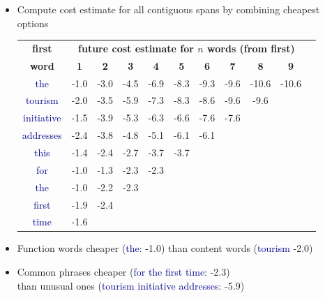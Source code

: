 \documentclass[landscape]{slides}
\newcommand{\example}[1]{\textcolor{darkblue}{\rm #1}}
\begin{document}
\begin{itemize} \vspace{-4mm}
\item Compute cost estimate for all contiguous spans by combining cheapest options\vspace{-2mm}
\begin{center}
\begin{tabular}{|c|c|c|c|c|c|c|c|c|c|c|} \hline
\bf first & \multicolumn{9}{c|}{\bf future cost estimate for $n$ words (from first)} \\ \cline{2-10}
\bf word & \bf 1 & \bf 2 & \bf 3 & \bf 4 & \bf 5 & \bf 6 & \bf 7 & \bf 8 & \bf 9 \\ \hline 
\example{the} & -1.0 &  -3.0 &  -4.5 &  -6.9 &  -8.3 &  -9.3 &  -9.6 & -10.6 & -10.6 \\ \hline
\example{tourism} & -2.0 &  -3.5 &  -5.9 &  -7.3 &  -8.3 &  -8.6 &  -9.6 &  -9.6 \\ \cline{1-9}
\example{initiative} & -1.5 &  -3.9 &  -5.3 &  -6.3 &  -6.6 &  -7.6 &  -7.6 \\\cline{1-8}
\example{addresses} & -2.4 &  -3.8 &  -4.8 &  -5.1 &  -6.1 &  -6.1 \\\cline{1-7}
\example{this} & -1.4 &  -2.4 &  -2.7 &  -3.7 &  -3.7 \\\cline{1-6}
\example{for} & -1.0 &  -1.3 &  -2.3 &  -2.3 \\\cline{1-5}
\example{the} & -1.0 &  -2.2 &  -2.3  \\\cline{1-4}
\example{first} & -1.9 &  -2.4  \\\cline{1-3}
\example{time} & -1.6  \\\cline{1-2}
\end{tabular}\vspace{-4mm}
\end{center} 
\item Function words cheaper (\example{the}: -1.0) than content words (\example{tourism} -2.0) \vspace{-8mm}
\item Common phrases cheaper (\example{for the first time}: -2.3)\\ than unusual ones (\example{tourism initiative addresses}: -5.9)
\end{itemize}

\end{document}
